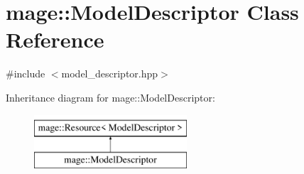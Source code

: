 \hypertarget{classmage_1_1_model_descriptor}{}\section{mage\+:\+:Model\+Descriptor Class Reference}
\label{classmage_1_1_model_descriptor}


{\ttfamily \#include $<$model\+\_\+descriptor.\+hpp$>$}

Inheritance diagram for mage\+:\+:Model\+Descriptor\+:\begin{figure}[H]
\begin{center}
\leavevmode
\includegraphics[height=2.000000cm]{classmage_1_1_model_descriptor}
\end{center}
\end{figure}
